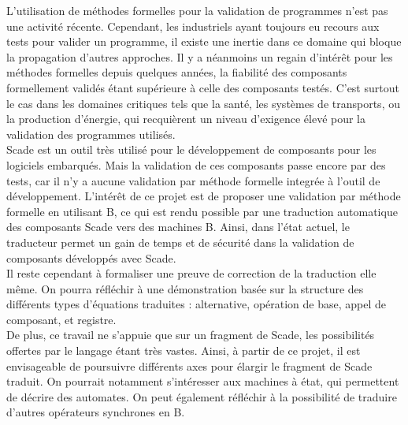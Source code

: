 

L'utilisation de méthodes formelles pour la validation de programmes n'est pas
une activité récente. Cependant, les industriels ayant toujours eu recours aux
tests pour valider un programme, il existe une inertie dans ce domaine
qui bloque la propagation d'autres approches.
Il y a néanmoins un regain d'intérêt pour les méthodes formelles
depuis quelques années, la fiabilité des composants formellement
validés étant supérieure à celle des composants testés. C'est surtout
le cas dans les domaines critiques tels que la santé, les systèmes de
transports, ou la production d'énergie, qui recquièrent un niveau
d'exigence élevé pour la validation des programmes utilisés.\\

Scade est un outil très utilisé pour le développement de composants
pour les logiciels embarqués. Mais la validation de ces composants
passe encore par des tests, car il n'y a aucune validation par méthode
formelle integrée à l'outil de développement. L'intérêt de ce projet
est de proposer une validation par méthode formelle en utilisant B, ce
qui est rendu possible par une traduction automatique des composants Scade
vers des machines B. 
Ainsi, dans l'état actuel, le traducteur permet un gain de temps et de
sécurité dans la validation de composants développés avec Scade.\\

Il reste cependant à formaliser une preuve de correction de la
traduction elle même. On pourra réfléchir à une démonstration basée
sur la structure des différents types d'équations traduites : alternative,
opération de base, appel de composant, et registre.\\
De plus, ce travail ne s'appuie que sur un fragment de Scade, les possibilités
offertes par le langage étant très vastes. Ainsi, à partir de ce
projet, il est envisageable de poursuivre différents axes pour élargir
le fragment de Scade traduit. On pourrait notamment s'intéresser aux
machines à état, qui permettent de décrire des automates. On peut
également réfléchir à la possibilité de traduire d'autres opérateurs
synchrones en B. 

